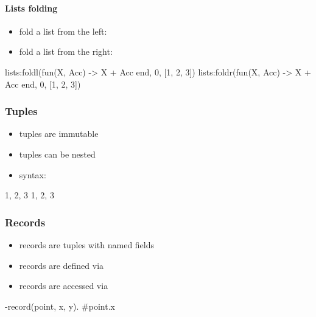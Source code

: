 \documentclass[a4paper,landscape,10pt]{article}
\begin{document}
\begin{multicols*}{2}
  \paragraph{Lists folding}

  \begin{itemize}
    \item fold a list from the left: 
    \item fold a list from the right: 
  \end{itemize}

  \begin{erlang}
lists:foldl(fun(X, Acc) -> X + Acc end, 0, [1, 2, 3]) %
lists:foldr(fun(X, Acc) -> X + Acc end, 0, [1, 2, 3]) %
\end{erlang}

  \subsubsection{Tuples}

  \begin{itemize}
    \item tuples are immutable
    \item tuples can be nested
    \item syntax: 
  \end{itemize}

  \begin{erlang}
{1, 2, 3} %
{1, {2, 3}} %
\end{erlang}

  \breakcolumn

  \subsubsection{Records}

  \begin{itemize}
    \item records are tuples with named fields
    \item records are defined via 
    \item records are accessed via 
  \end{itemize}

  \begin{erlang}
-record(point, {x, y}).
#point.x %
\end{erlang}


\end{multicols*}
\end{document}
